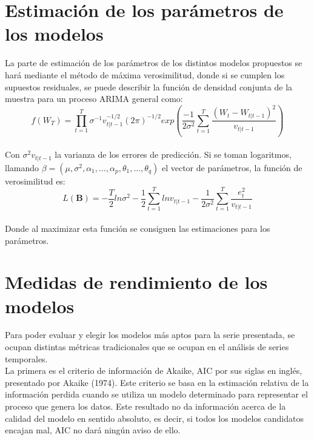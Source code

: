 \documentclass{report}
\begin{document}
\section{Estimación de los parámetros de los modelos}
La parte de estimación de los parámetros de los distintos modelos propuestos se hará mediante el método de máxima verosimilitud, donde si se cumplen los supuestos residuales, se puede describir la función de densidad conjunta de la muestra para un proceso ARIMA general como:\\
\begin{equation}
    f(W_{T})=\prod_{t=1}^{T}\sigma^{-1}v_{t|t-1}^{-1/2}(2\pi)^{-1/2}exp\left(\frac{-1}{2\sigma^{2}}\sum_{t=1}^{T}\frac{(W_{t}-W_{t|t-1})^{2}}{v_{t|t-1}}\right)
\end{equation}\\

Con $\sigma^{2}v_{t|t-1}$ la varianza de los errores de predicción. Si se toman logaritmos, llamando $\beta=(\mu,\sigma^{2},\alpha_{1},...,\alpha_{p},\theta_{1},...,\theta_{q})$ el vector de parámetros, la función de verosimilitud es:\\
\begin{equation}
    L(\boldsymbol{B})=-\frac{T}{2}ln\sigma^{2}-\frac{1}{2}\sum_{t=1}^{T}lnv_{t|t-1}-\frac{1}{2\sigma^{2}}\sum_{t=1}^{T}\frac{e_{t}^{2}}{v_{t|t-1}}
\end{equation}\\

Donde al maximizar esta función se consiguen las estimaciones para los parámetros.\\
\section{Medidas de rendimiento de los modelos}
Para poder evaluar y elegir los modelos más aptos para la serie presentada, se ocupan distintas métricas tradicionales que se ocupan en el análisis de series temporales.\\

La primera es el criterio de información de Akaike, AIC por sus siglas en inglés, presentado por Akaike (1974). Este criterio se basa en la estimación relativa de la información perdida cuando se utiliza un modelo determinado para representar el proceso que genera los datos. Este resultado no da información acerca de la calidad del modelo en sentido absoluto, es decir, si todos los modelos candidatos encajan mal, AIC no dará ningún aviso de ello.\\
\end{document}

